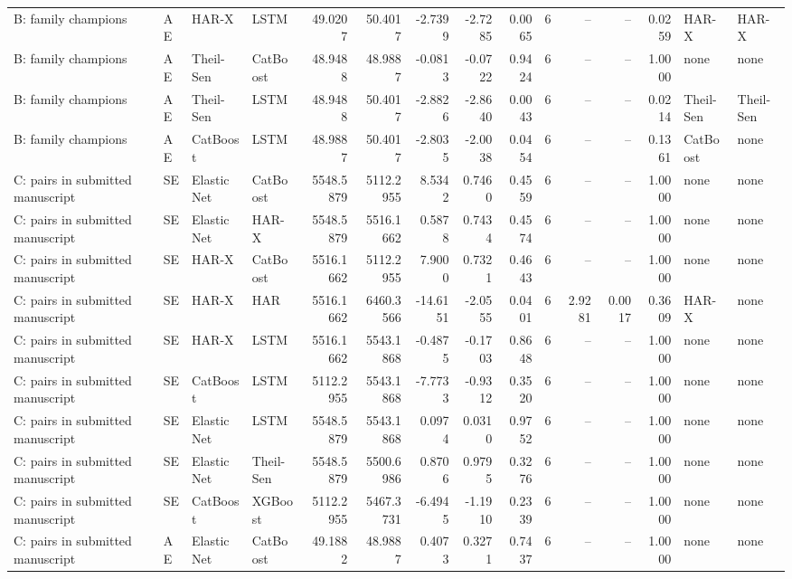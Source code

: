 \begin{table}[htbp]
{\begin{tabular}{llllrrrrrrrrrll}
B: family champions & AE & HAR-X & LSTM & 49.0207 & 50.4017 & -2.7399 & -2.7285 & 0.0065 & 6 & -- & -- & 0.0259 & HAR-X & HAR-X \\
B: family champions & AE & Theil-Sen & CatBoost & 48.9488 & 48.9887 & -0.0813 & -0.0722 & 0.9424 & 6 & -- & -- & 1.0000 & none & none \\
B: family champions & AE & Theil-Sen & LSTM & 48.9488 & 50.4017 & -2.8826 & -2.8640 & 0.0043 & 6 & -- & -- & 0.0214 & Theil-Sen & Theil-Sen \\
B: family champions & AE & CatBoost & LSTM & 48.9887 & 50.4017 & -2.8035 & -2.0038 & 0.0454 & 6 & -- & -- & 0.1361 & CatBoost & none \\
C: pairs in submitted manuscript & SE & Elastic Net & CatBoost & 5548.5879 & 5112.2955 & 8.5342 & 0.7460 & 0.4559 & 6 & -- & -- & 1.0000 & none & none \\
C: pairs in submitted manuscript & SE & Elastic Net & HAR-X & 5548.5879 & 5516.1662 & 0.5878 & 0.7434 & 0.4574 & 6 & -- & -- & 1.0000 & none & none \\
C: pairs in submitted manuscript & SE & HAR-X & CatBoost & 5516.1662 & 5112.2955 & 7.9000 & 0.7321 & 0.4643 & 6 & -- & -- & 1.0000 & none & none \\
C: pairs in submitted manuscript & SE & HAR-X & HAR & 5516.1662 & 6460.3566 & -14.6151 & -2.0555 & 0.0401 & 6 & 2.9281 & 0.0017 & 0.3609 & HAR-X & none \\
C: pairs in submitted manuscript & SE & HAR-X & LSTM & 5516.1662 & 5543.1868 & -0.4875 & -0.1703 & 0.8648 & 6 & -- & -- & 1.0000 & none & none \\
C: pairs in submitted manuscript & SE & CatBoost & LSTM & 5112.2955 & 5543.1868 & -7.7733 & -0.9312 & 0.3520 & 6 & -- & -- & 1.0000 & none & none \\
C: pairs in submitted manuscript & SE & Elastic Net & LSTM & 5548.5879 & 5543.1868 & 0.0974 & 0.0310 & 0.9752 & 6 & -- & -- & 1.0000 & none & none \\
C: pairs in submitted manuscript & SE & Elastic Net & Theil-Sen & 5548.5879 & 5500.6986 & 0.8706 & 0.9795 & 0.3276 & 6 & -- & -- & 1.0000 & none & none \\
C: pairs in submitted manuscript & SE & CatBoost & XGBoost & 5112.2955 & 5467.3731 & -6.4945 & -1.1910 & 0.2339 & 6 & -- & -- & 1.0000 & none & none \\
C: pairs in submitted manuscript & AE & Elastic Net & CatBoost & 49.1882 & 48.9887 & 0.4073 & 0.3271 & 0.7437 & 6 & -- & -- & 1.0000 & none & none \\

\end{tabular}}
\end{table}
